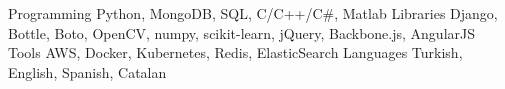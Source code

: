 

\begin{cvskills}
  \cvskill
    {Programming} %
    {Python, MongoDB, SQL, C/C++/C\#, Matlab} %
  \cvskill
    {Libraries} %
    {Django, Bottle, Boto, OpenCV, numpy, scikit-learn, jQuery, Backbone.js, AngularJS} %
  \cvskill
    {Tools} %
    {AWS, Docker, Kubernetes, Redis, ElasticSearch} %
  \cvskill
    {Languages} %
    {Turkish, English, Spanish, Catalan} %
\end{cvskills}


\begin{cvcourses}
\end{cvcourses}


